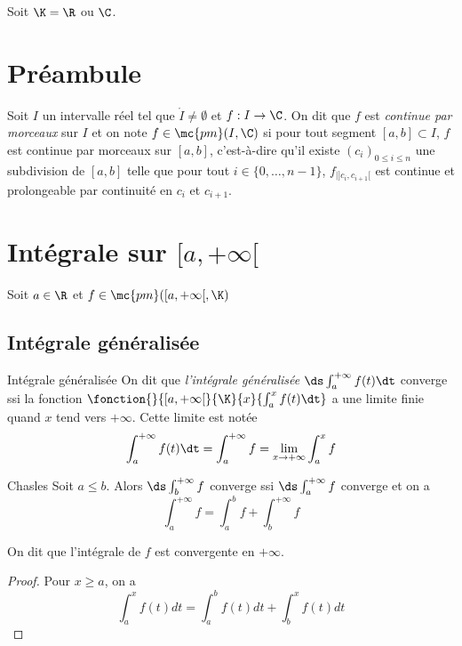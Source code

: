 Soit $\K = \R$ ou $\C$. 

\section*{Préambule}

\begin{definition}{}{}
    Soit $I$ un intervalle réel tel que $\mathring I \neq \emptyset$ et $f : I \to \C$. 
    On dit que $f$ est \textit{continue par morceaux} sur $I$ et on note $f \in \mc{pm}(I, \C)$ si pour tout segment 
    $[a, b] \subset I$, $f$ est continue par morceaux sur $[a, b]$, c'est-à-dire qu'il existe 
    $(c_i)_{0 \leq i \leq n}$ une subdivision de $[a, b]$ telle que pour tout $i \in \{0, \ldots, n-1\}$,
    $f_{|]c_i, c_{i+1}[}$ est continue et prolongeable par continuité en $c_i$ et $c_{i+1}$.
\end{definition}


\section{Intégrale sur \texorpdfstring{$[a, + \infty[$}{x >= a}}

Soit $a \in \R$ et $f \in \mc{pm} ([a, + \infty[, \K)$

\subsection{Intégrale généralisée }

\begin{definition}{Intégrale généralisée}{}
    On dit que \textit{l'intégrale généralisée} $\ds \int_a^{+ \infty} f(t) \dt$ converge ssi 
    la fonction $\fonction{}{[a, + \infty[}{\K}{x}{\int_a^x f(t) \dt}$ a une limite finie quand 
    $x$ tend vers $+ \infty$. Cette limite est notée 
    $$\int_a^{+ \infty} f(t) \dt = \int_{a }^{+ \infty   } f = \lim_{x \to + \infty} \int_{a }^{x } f$$
\end{definition}

\begin{proposition}{Chasles}{}
    Soit $a \leqslant b $. Alors $\ds \int_b^{+ \infty} f $ converge ssi 
    $\ds \int_a^{+ \infty} f $ converge et on a 
    $$\int_a^{+ \infty} f = \int_a^b f + \int_b^{+ \infty} f$$

    On dit que l'intégrale de $f$ est convergente en $+\infty$.
\end{proposition}

\begin{proof}
    Pour $x \geqslant a$, on a 
    $$\int_a^x f(t) dt = \int_a^b f(t) dt + \int_b^x f(t) dt$$
\end{proof}

